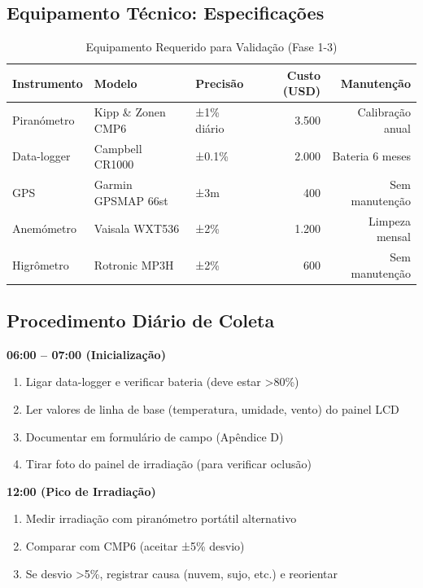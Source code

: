 \documentclass[12pt, a4paper]{article}
\begin{document}
\begin{itemize}
\subsection{Equipamento Técnico: Especificações}

\begin{table}[H]
\centering
\caption{Equipamento Requerido para Validação (Fase 1-3)}
\label{tab:equipment_specs}
\small
\begin{tabular}{|l|l|l|r|r|}
\hline
\textbf{Instrumento} & \textbf{Modelo} & \textbf{Precisão} & \textbf{Custo (USD)} & \textbf{Manutenção} \\
\hline
Piranómetro & Kipp \& Zonen CMP6 & ±1\% diário & 3.500 & Calibração anual \\
Data-logger & Campbell CR1000 & ±0.1\% & 2.000 & Bateria 6 meses \\
GPS & Garmin GPSMAP 66st & ±3m & 400 & Sem manutenção \\
Anemómetro & Vaisala WXT536 & ±2\% & 1.200 & Limpeza mensal \\
Higrômetro & Rotronic MP3H & ±2\% & 600 & Sem manutenção \\
\hline
\end{tabular}
\end{table}

\subsection{Procedimento Diário de Coleta}

\textbf{06:00 – 07:00 (Inicialização)}
\begin{enumerate}
\item Ligar data-logger e verificar bateria (deve estar >80\%)
\item Ler valores de linha de base (temperatura, umidade, vento) do painel LCD
\item Documentar em formulário de campo (Apêndice D)
\item Tirar foto do painel de irradiação (para verificar oclusão)
\end{enumerate}

\textbf{12:00 (Pico de Irradiação)}
\begin{enumerate}
\item Medir irradiação com piranómetro portátil alternativo
\item Comparar com CMP6 (aceitar ±5\% desvio)
\item Se desvio >5\%, registrar causa (nuvem, sujo, etc.) e reorientar
\end{enumerate}


\end{itemize}
\end{document}

